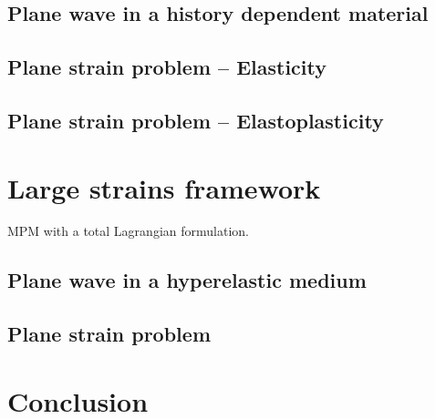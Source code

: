 \subsection{Plane wave in a history dependent material}
\label{sec:hpp_planewave}


\subsection{Plane strain problem -- Elasticity}
\label{sec:el_planestrain}


\subsection{Plane strain problem -- Elastoplasticity}
\label{sec:ep_planestrain}


\section{Large strains framework}
\label{sec:he_simulations}
MPM with a total Lagrangian formulation.
\subsection{Plane wave in a hyperelastic medium}
\label{sec:he_planewave}


\subsection{Plane strain problem}
\label{sec:he_plate}




\section{Conclusion}
